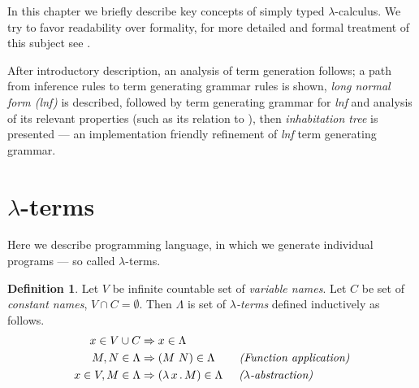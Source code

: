 \documentclass[12pt,a4paper]{report}
\newcommand{\lterms}{$\lambda$-terms\xspace}
\begin{document}
\newcommand{\lnf}{\textit{lnf}\xspace}


In this chapter we briefly describe key concepts
of simply typed $\lambda$-calculus.
We try to favor readability over formality,
for more detailed and formal treatment of this subject see 
\cite{barendregt92,barendregt10}.

After introductory description, an analysis of term generation follows; 
a path from inference rules to term generating grammar rules is shown,
\textit{long normal form (lnf)} is described,
followed by term generating grammar for \textit{lnf}
and analysis of its relevant properties (such as its relation to \benf),
then \textit{inhabitation tree} is presented --- 
an implementation friendly refinement of 
\textit{lnf} term generating grammar.

	
\theoremstyle{plain} 
\newtheorem{theorem}{Theorem} 
\newtheorem{proposition}{Proposition} 
\newtheorem{lemma}{Lemma} 
\newtheorem*{corollary}{Corollary}

\theoremstyle{definition} 
\newtheorem*{definition}{Definition} 
\newtheorem{conjecture}{Conjecture}
 \newtheorem*{example}{Example} 

\theoremstyle{remark} 
\newtheorem*{remark}{Remark} 
\newtheorem*{note}{Note} 
\newtheorem{case}{Case}

		
\section{\lterms}
\label{deflam}

Here we  %
describe programming language, 
in which we generate individual programs --- so called \lterms.  






\begin{definition}

Let $V$ be infinite countable set of {\it 
variable names}. Let $C$ be set of {\it constant names}, 
$V \cap C = \emptyset$.	 	
Then $\Lambda$ is set of {\it \lterms} defined inductively as follows.	
\begin{align*}
x   \in V \cup C  &\Rightarrow x     \in \Lambda \\
M,N \in \Lambda   &\Rightarrow (M~N) \in \Lambda 
\textit{~~~~~~(Function application)} \\
x   \in V , M \in \Lambda &\Rightarrow ( \lambda \, x \, . \, M ) \in \Lambda
\textit{~~~~($\lambda$-abstraction)} 
\end{align*}~
\end{definition}
\end{document}
